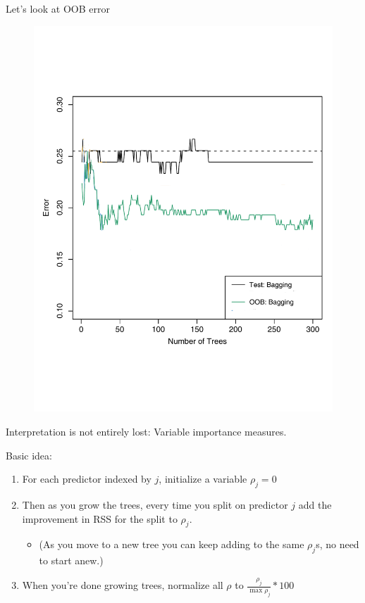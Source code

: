 \documentclass[mathserif, aspectratio=169]{beamer}
\begin{document}
\begin{frame}{Let's look at OOB error}

\begin{figure}
\includegraphics[height=0.85\textheight]{islr88_BagAndOOB.pdf}
\caption*{}
\end{figure}
\end{frame}

\begin{frame}{Interpretation is not entirely lost: Variable importance measures.}

Basic idea: 
\begin{enumerate}
\item For each predictor indexed by $j$, initialize a variable $\rho_j =0$
\item Then as you grow the trees, every time you split on predictor $j$ add the improvement in RSS for the split to $\rho_j$.  
\begin{itemize}
\item (As you move to a new tree you can keep adding to the same $\rho_j$s, no need to start anew.)
\end{itemize}
\item When you're done growing trees, normalize all $\rho$ to $\frac{\rho_j}{\max{\rho_j}}*100$
\end{enumerate}

\end{frame}
\end{document}
